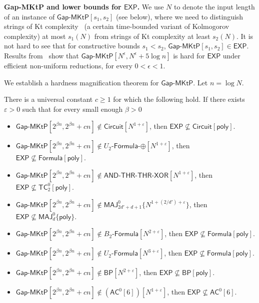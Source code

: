\documentclass{toc}
\newcommand{\gapmktp}{\mathsf{Gap}$-$\mathsf{MKtP}}
\begin{document}
\noindent \textbf{Gap-MKtP and lower bounds for $\mathsf{EXP}$.} We use $N$ to denote the input length of an instance of $\gapmktp[s_1,s_2]$ (see  below), where we need to distinguish strings of Kt complexity~\cite{Levin84} (a certain time-bounded variant of Kolmogorov complexity) at most $s_1(N)$ from strings of Kt complexity at least $s_2(N)$. It is not hard to see that for constructive bounds $s_1 < s_2$, $\gapmktp[s_1,s_2] \in \mathsf{EXP}$. Results from~\cite{DBLP:journals/siamcomp/AllenderBKMR06} show that $\gapmktp[N^{\epsilon},N^{\epsilon}+5\log n]$ is hard for $\mathsf{EXP}$ under efficient non-uniform reductions, for every $0 < \epsilon< 1$.

We establish a hardness magnification theorem for $\gapmktp$.
Let $n = \log N$. 

\begin{theorem}\label{thm:magnification} There is a universal constant $c \geq 1$ for which the following hold. If there exists $\varepsilon > 0$ such that for every small enough $\beta > 0$
\vspace{0.2cm} 
\begin{itemize}
\item[\emph{1.}] $\gapmktp[2^{\beta n}, 2^{\beta n} + cn] \notin \mathsf{Circuit}[N^{1 + \varepsilon}]$, then $\mathsf{EXP} \nsubseteq \mathsf{Circuit}[\mathsf{poly}]$.
\item[\emph{2.}] $\gapmktp[2^{\beta n}, 2^{\beta n} + cn] \notin U_2$-$\mathsf{Formula}$-$\oplus[N^{1 + \varepsilon}]$, then $\mathsf{EXP} \nsubseteq \mathsf{Formula}[\mathsf{poly}]$.
\item[\emph{3.}] $\gapmktp[2^{\beta n}, 2^{\beta n} + cn] \notin \mathsf{AND}$-$\mathsf{THR}$-$\mathsf{THR}$-$\mathsf{XOR}[N^{1 + \varepsilon}]$, then $\mathsf{EXP} \nsubseteq \mathsf{TC}^0_2[\mathsf{poly}]$.
\item[\emph{4.}] $\gapmktp[2^{\beta n}, 2^{\beta n} + cn] \notin \mathsf{MAJ}^0_{2d' + d + 1}\{N^{1 + (2/d') + \varepsilon}\}$, then $\mathsf{EXP} \nsubseteq \mathsf{MAJ}^0_d\{\mathsf{poly}\}$.
\item[\emph{5.}] $\gapmktp[2^{\beta n}, 2^{\beta n} + cn] \notin B_2$-$\mathsf{Formula}[N^{2 + \varepsilon}]$, then $\mathsf{EXP} \nsubseteq \mathsf{Formula}[\mathsf{poly}]$.
\item[\emph{6.}] $\gapmktp[2^{\beta n}, 2^{\beta n} + cn] \notin U_2$-$\mathsf{Formula}[N^{3 + \varepsilon}]$, then $\mathsf{EXP} \nsubseteq \mathsf{Formula}[\mathsf{poly}]$.
\item[\emph{7.}] $\gapmktp[2^{\beta n}, 2^{\beta n} + cn] \notin \mathsf{BP}[N^{2 + \varepsilon}]$, then $\mathsf{EXP} \nsubseteq \mathsf{BP}[\mathsf{poly}]$.
\item[\emph{8.}] $\gapmktp[2^{\beta n}, 2^{\beta n} + cn] \notin (\mathsf{AC}^0[6])[N^{1 + \varepsilon}]$, then $\mathsf{EXP} \nsubseteq \mathsf{AC}^0[6]$.
\end{itemize} 
\end{theorem}
\end{document}
